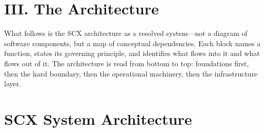 \documentclass[11pt,a4paper]{article}
\theoremstyle{definition}
\begin{document}
\section*{III. The Architecture}

What follows is the SCX architecture as a resolved system---not a diagram of software components, but a map of conceptual dependencies. Each block names a function, states its governing principle, and identifies what flows into it and what flows out of it. The architecture is read from bottom to top: foundations first, then the hard boundary, then the operational machinery, then the infrastructure layer.

\newpage

\section*{SCX System Architecture}
\end{document}

